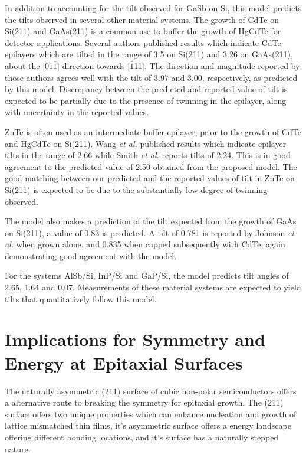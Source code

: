 In addition to accounting for the tilt observed for GaSb on Si, this model predicts the tilts observed in several other material systems.
The growth of CdTe on Si(211) and GaAs(211) is a common use to buffer the growth of HgCdTe for detector applications.
Several authors\cite{Triboulet2009,Yu1999,Lange1991} published results which indicate CdTe epilayers which are tilted in the range of 3.5\degree{} on Si(211)\cite{Zhao2011} and 3.26\degree{} on GaAs(211)\cite{Johnson2011}, about the [01\(\overline{1}\)] direction towards [\(\overline{1}\)11].
The direction and magnitude reported by those authors agrees well with the tilt of 3.97\degree{} and 3.00\degree{}, respectively, as predicted by this model.
Discrepancy between the predicted and reported value of tilt is expected to be partially due to the presence of twinning in the epilayer, along with uncertainty in the reported values.

ZnTe is often used as an intermediate buffer epilayer, prior to the growth of CdTe and HgCdTe on Si(211)\cite{Zhao2011,Dhar1997a}.
Wang \textit{et al.}\cite{Wang2011a} published results which indicate epilayer tilts in the range of 2.66\degree{} while Smith \textit{et al.}\cite{smith2012_znte} reports tilts of 2.24\degree{}.
This is in good agreement to the predicted value of 2.50\degree{} obtained from the proposed model.
The good matching between our predicted and the reported values of tilt in ZnTe on Si(211) is expected to be due to the substantially low degree of twinning observed.

The model also makes a prediction of the tilt expected from the growth of GaAs on Si(211), a value of 0.83\degree{} is predicted.
A tilt of 0.781\degree{} is reported by Johnson \textit{et al.}\cite{Johnson2011} when grown alone, and 0.835\degree{} when capped subsequently with CdTe, again demonstrating good agreement with the model.

For the systems AlSb/Si, InP/Si and GaP/Si, the model predicts tilt angles of 2.65\degree{}, 1.64\degree{} and 0.07\degree{}.
Measurements of these material systems are expected to yield tilts that quantitatively follow this model.
\section{Implications for Symmetry and Energy at Epitaxial Surfaces}
The naturally asymmetric (211) surface of cubic non-polar semiconductors offers a alternative route to breaking the symmetry for epitaxial growth.
The (211) surface offers two unique properties which can enhance nucleation and growth of lattice mismatched thin films, it's asymmetric surface offers a energy landscape offering different bonding locations, and it's surface has a naturally stepped nature.

